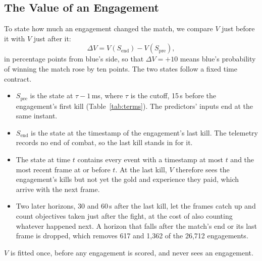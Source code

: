 \subsection{The Value of an Engagement}\label{sec:limit-delta}

To state how much an engagement changed the match, we compare $V$ just before it with $V$ just after it:
\begin{equation}
\Delta V = V(S_{\mathrm{end}}) - V(S_{\mathrm{pre}}),
\end{equation}
in percentage points from blue's side, so that $\Delta V = +10$ means blue's probability of winning the
match rose by ten points. The two states follow a fixed time contract.
\begin{itemize}
\item $S_{\mathrm{pre}}$ is the state at $\tau - 1$\,ms, where $\tau$ is the cutoff, 15\,s before the
  engagement's first kill (Table~\ref{tab:terms}). The predictors' inputs end at the same instant.
\item $S_{\mathrm{end}}$ is the state at the timestamp of the engagement's last kill. The telemetry records
  no end of combat, so the last kill stands in for it.
\item The state at time $t$ contains every event with a timestamp at most $t$ and the most recent frame at
  or before $t$. At the last kill, $V$ therefore sees the engagement's kills but not yet the gold and
  experience they paid, which arrive with the next frame.
\item Two later horizons, 30 and 60\,s after the last kill, let the frames catch up and count objectives
  taken just after the fight, at the cost of also counting whatever happened next. A horizon that falls
  after the match's end or its last frame is dropped, which removes 617 and 1,362 of the 26,712
  engagements.
\end{itemize}
$V$ is fitted once, before any engagement is scored, and never sees an engagement.

